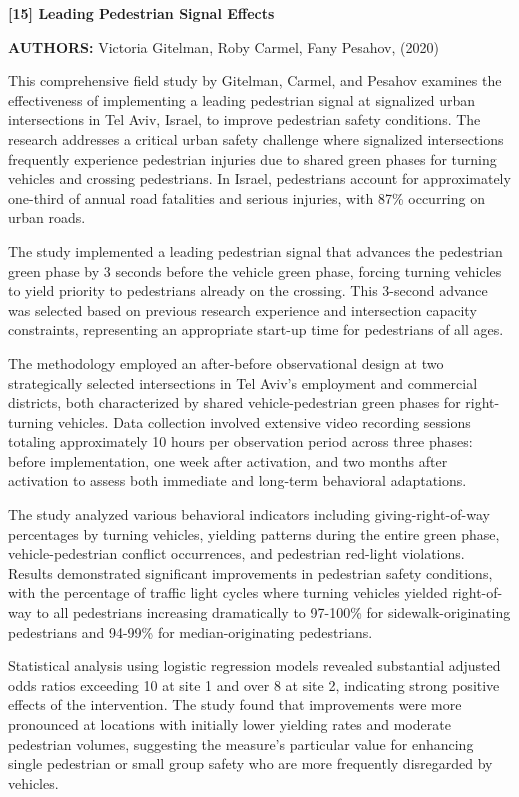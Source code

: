 \documentclass[a4paper, 12pt]{report}
\begin{document}
\noindent \textbf{[15] Leading Pedestrian Signal Effects}

\textbf{AUTHORS:} Victoria Gitelman, Roby Carmel, Fany Pesahov, (2020)


This comprehensive field study by Gitelman, Carmel, and Pesahov examines the effectiveness of implementing a leading pedestrian signal at signalized urban intersections in Tel Aviv, Israel, to improve pedestrian safety conditions. The research addresses a critical urban safety challenge where signalized intersections frequently experience pedestrian injuries due to shared green phases for turning vehicles and crossing pedestrians. In Israel, pedestrians account for approximately one-third of annual road fatalities and serious injuries, with 87\% occurring on urban roads.

The study implemented a leading pedestrian signal that advances the pedestrian green phase by 3 seconds before the vehicle green phase, forcing turning vehicles to yield priority to pedestrians already on the crossing. This 3-second advance was selected based on previous research experience and intersection capacity constraints, representing an appropriate start-up time for pedestrians of all ages.

The methodology employed an after-before observational design at two strategically selected intersections in Tel Aviv's employment and commercial districts, both characterized by shared vehicle-pedestrian green phases for right-turning vehicles. Data collection involved extensive video recording sessions totaling approximately 10 hours per observation period across three phases: before implementation, one week after activation, and two months after activation to assess both immediate and long-term behavioral adaptations.

The study analyzed various behavioral indicators including giving-right-of-way percentages by turning vehicles, yielding patterns during the entire green phase, vehicle-pedestrian conflict occurrences, and pedestrian red-light violations. Results demonstrated significant improvements in pedestrian safety conditions, with the percentage of traffic light cycles where turning vehicles yielded right-of-way to all pedestrians increasing dramatically to 97-100\% for sidewalk-originating pedestrians and 94-99\% for median-originating pedestrians.

Statistical analysis using logistic regression models revealed substantial adjusted odds ratios exceeding 10 at site 1 and over 8 at site 2, indicating strong positive effects of the intervention. The study found that improvements were more pronounced at locations with initially lower yielding rates and moderate pedestrian volumes, suggesting the measure's particular value for enhancing single pedestrian or small group safety who are more frequently disregarded by vehicles.
\end{document}
